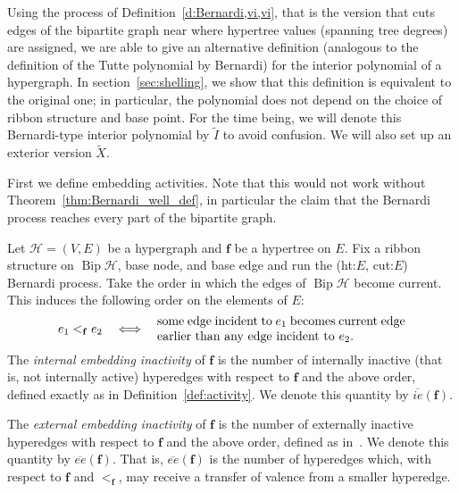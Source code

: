 \documentclass[ALCO,ThmDefs,Unicode,epreuves]{cedram}
\newcommand{\HH}{\mathcal H}
\DeclareMathOperator{\bip}{Bip}
\begin{document}
Using the process of Definition~\ref{d:Bernardi,vi,vi}, that is the version that cuts edges of the bipartite graph near where hypertree values (spanning tree degrees) are assigned, we are able to give an alternative definition (analogous to the definition of the Tutte polynomial by Bernardi) for the interior polynomial of a hypergraph. 
In section~\ref{sec:shelling}, we show that this definition is equivalent to the original one; in particular, the polynomial does not depend on the choice of ribbon structure and base point. For the time being, we will denote this Bernardi-type interior polynomial by $\tilde{I}$ to avoid confusion. We will also set up an exterior version $\tilde X$. 

First we define embedding activities. Note that this would not work without Theorem~\ref{thm:Bernardi_well_def}, in particular the claim that the Bernardi process reaches every part of the bipartite graph.

\begin{defi}
\label{def:hyperactivity}
Let $\HH=(V,E)$ be a hypergraph and $\mathbf f$ be a hypertree on $E$. Fix a ribbon structure on $\bip\HH$, base node, and base edge and run the (ht:$E$, cut:$E$) Bernardi process. Take the order in which the edges of $\bip \HH$ become current. This induces the following order on the elements of $E$:
\begin{equation}
\label{eq:hyperedge_order}
 e_1<_{\mathbf f}e_2 \quad \Longleftrightarrow \quad \text{\parbox{7cm}{some edge incident to $e_1$ becomes current edge earlier than any edge incident to $e_2$.}}
\end{equation}
The \emph{internal embedding inactivity} of $\mathbf f$ is the number of internally inactive (that is, not internally active) hyperedges with respect to $\mathbf f$ and the above order, defined exactly as in Definition~\ref{def:activity}. We denote this quantity by $\overline{ie}(\mathbf f)$.

The \emph{external embedding inactivity} of $\mathbf f$ is the number of externally inactive hyperedges with respect to $\mathbf f$ and the above order, defined as in~\cite[Definition~5.1]{hiperTutte}. We denote this quantity by $\overline{ee}(\mathbf f)$. That is, $\overline{ee}(\mathbf f)$ is the number of hyperedges which, with respect to $\mathbf f$ and $<_\mathbf f$, may receive a transfer of valence from a smaller hyperedge. 
\end{defi}
\end{document}
